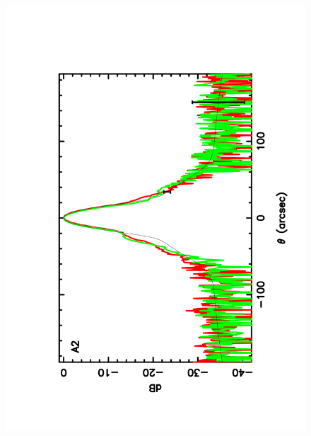 \begin{figure}
\begin{center}
\includegraphics[clip, angle=-90, scale = 0.3]{Figures/Array_A2_dB.pdf}

\end{center}
\end{figure}
